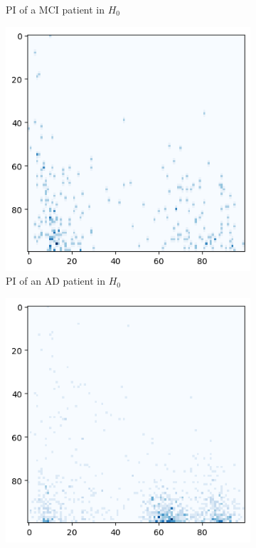 \documentclass{article}
\begin{document}
\begin{figure}
\begin{subfigure}{0.32\textwidth}
    \caption{PI of a MCI patient in $H_0$}
  \end{subfigure}
  \begin{subfigure}{0.32\textwidth}
    \includegraphics[width=\textwidth]{figures/PIs/Persistence_image_AD_h_0.png}
    \caption{PI of an AD patient in $H_0$}
  \end{subfigure}
  \begin{subfigure}{0.32\textwidth}
    \includegraphics[width=\textwidth]{figures/PIs/Persistence_image_CN_h_1.png}

\end{subfigure}
\end{figure}
\end{document}
